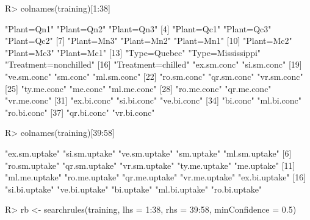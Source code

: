 \begin{Schunk}
% --begin: "pbld4"
\begin{Sinput}
R> colnames(training)[1:38]
\end{Sinput}
\begin{Soutput}
 [1] "Plant=Qn1"            "Plant=Qn2"            "Plant=Qn3"           
 [4] "Plant=Qc1"            "Plant=Qc3"            "Plant=Qc2"           
 [7] "Plant=Mn3"            "Plant=Mn2"            "Plant=Mn1"           
[10] "Plant=Mc2"            "Plant=Mc3"            "Plant=Mc1"           
[13] "Type=Quebec"          "Type=Mississippi"     "Treatment=nonchilled"
[16] "Treatment=chilled"    "ex.sm.conc"           "si.sm.conc"          
[19] "ve.sm.conc"           "sm.conc"              "ml.sm.conc"          
[22] "ro.sm.conc"           "qr.sm.conc"           "vr.sm.conc"          
[25] "ty.me.conc"           "me.conc"              "ml.me.conc"          
[28] "ro.me.conc"           "qr.me.conc"           "vr.me.conc"          
[31] "ex.bi.conc"           "si.bi.conc"           "ve.bi.conc"          
[34] "bi.conc"              "ml.bi.conc"           "ro.bi.conc"          
[37] "qr.bi.conc"           "vr.bi.conc"          
\end{Soutput}
\begin{Sinput}
R> colnames(training)[39:58]
\end{Sinput}
\begin{Soutput}
 [1] "ex.sm.uptake" "si.sm.uptake" "ve.sm.uptake" "sm.uptake"    "ml.sm.uptake"
 [6] "ro.sm.uptake" "qr.sm.uptake" "vr.sm.uptake" "ty.me.uptake" "me.uptake"   
[11] "ml.me.uptake" "ro.me.uptake" "qr.me.uptake" "vr.me.uptake" "ex.bi.uptake"
[16] "si.bi.uptake" "ve.bi.uptake" "bi.uptake"    "ml.bi.uptake" "ro.bi.uptake"
\end{Soutput}
\begin{Sinput}
R> rb <- searchrules(training, lhs = 1:38, rhs = 39:58, minConfidence = 0.5)
\end{Sinput}
%
% --end: "pbld4"
\end{Schunk}
